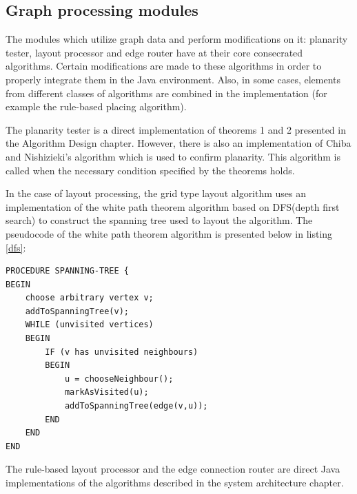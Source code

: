 \subsection{Graph processing modules}

The modules which utilize graph data and perform modifications on it: planarity tester, layout processor and edge router 
have at their core consecrated algorithms. Certain modifications are made to these algorithms in order to properly integrate 
them in the Java environment. Also, in some cases, elements from different classes of algorithms are combined in the 
implementation (for example the rule-based placing algorithm).

The planarity tester is a direct implementation of theorems 1 and 2 presented in the Algorithm Design chapter. However, there 
is also an implementation of Chiba and Nishizieki's algorithm which is used to confirm planarity. This algorithm is called 
when the necessary condition specified by the theorems holds.

In the case of layout processing, the grid type layout algorithm uses an implementation of the white path theorem algorithm 
based on DFS(depth first search) to construct the spanning tree used to layout the algorithm. The pseudocode of the white path 
theorem algorithm is presented below in listing \ref{dfs}:

\begin{lstlisting}[caption=Spanning tree algorithm using DFS \label{dfs}]
PROCEDURE SPANNING-TREE {
BEGIN
	choose arbitrary vertex v;
	addToSpanningTree(v);
	WHILE (unvisited vertices)
	BEGIN
		IF (v has unvisited neighbours)
		BEGIN
			u = chooseNeighbour();
			markAsVisited(u);
			addToSpanningTree(edge(v,u));
		END
	END
END
\end{lstlisting}

The rule-based layout processor and the edge connection router are direct Java implementations of the algorithms described 
in the system architecture chapter.

